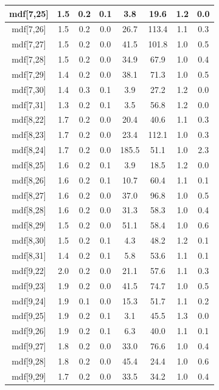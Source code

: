 \begin{longtable}{|c|c|c|c|c|c|c|c|}
\hline
mdf[7,25] & 1.5 & 0.2 & 0.1 & 3.8 & 19.6 & 1.2 & 0.0 \\
\hline
mdf[7,26] & 1.5 & 0.2 & 0.0 & 26.7 & 113.4 & 1.1 & 0.3 \\
\hline
mdf[7,27] & 1.5 & 0.2 & 0.0 & 41.5 & 101.8 & 1.0 & 0.5 \\
\hline
mdf[7,28] & 1.5 & 0.2 & 0.0 & 34.9 & 67.9 & 1.0 & 0.4 \\
\hline
mdf[7,29] & 1.4 & 0.2 & 0.0 & 38.1 & 71.3 & 1.0 & 0.5 \\
\hline
mdf[7,30] & 1.4 & 0.3 & 0.1 & 3.9 & 27.2 & 1.2 & 0.0 \\
\hline
mdf[7,31] & 1.3 & 0.2 & 0.1 & 3.5 & 56.8 & 1.2 & 0.0 \\
\hline
mdf[8,22] & 1.7 & 0.2 & 0.0 & 20.4 & 40.6 & 1.1 & 0.3 \\
\hline
mdf[8,23] & 1.7 & 0.2 & 0.0 & 23.4 & 112.1 & 1.0 & 0.3 \\
\hline
mdf[8,24] & 1.7 & 0.2 & 0.0 & 185.5 & 51.1 & 1.0 & 2.3 \\
\hline
mdf[8,25] & 1.6 & 0.2 & 0.1 & 3.9 & 18.5 & 1.2 & 0.0 \\
\hline
mdf[8,26] & 1.6 & 0.2 & 0.1 & 10.7 & 60.4 & 1.1 & 0.1 \\
\hline
mdf[8,27] & 1.6 & 0.2 & 0.0 & 37.0 & 96.8 & 1.0 & 0.5 \\
\hline
mdf[8,28] & 1.6 & 0.2 & 0.0 & 31.3 & 58.3 & 1.0 & 0.4 \\
\hline
mdf[8,29] & 1.5 & 0.2 & 0.0 & 51.1 & 58.4 & 1.0 & 0.6 \\
\hline
mdf[8,30] & 1.5 & 0.2 & 0.1 & 4.3 & 48.2 & 1.2 & 0.1 \\
\hline
mdf[8,31] & 1.4 & 0.2 & 0.1 & 5.8 & 53.6 & 1.1 & 0.1 \\
\hline
mdf[9,22] & 2.0 & 0.2 & 0.0 & 21.1 & 57.6 & 1.1 & 0.3 \\
\hline
mdf[9,23] & 1.9 & 0.2 & 0.0 & 41.5 & 74.7 & 1.0 & 0.5 \\
\hline
mdf[9,24] & 1.9 & 0.1 & 0.0 & 15.3 & 51.7 & 1.1 & 0.2 \\
\hline
mdf[9,25] & 1.9 & 0.2 & 0.1 & 3.1 & 45.5 & 1.3 & 0.0 \\
\hline
mdf[9,26] & 1.9 & 0.2 & 0.1 & 6.3 & 40.0 & 1.1 & 0.1 \\
\hline
mdf[9,27] & 1.8 & 0.2 & 0.0 & 33.0 & 76.6 & 1.0 & 0.4 \\
\hline
mdf[9,28] & 1.8 & 0.2 & 0.0 & 45.4 & 24.4 & 1.0 & 0.6 \\
\hline
mdf[9,29] & 1.7 & 0.2 & 0.0 & 33.5 & 34.2 & 1.0 & 0.4 \\
\hline

\end{longtable}
